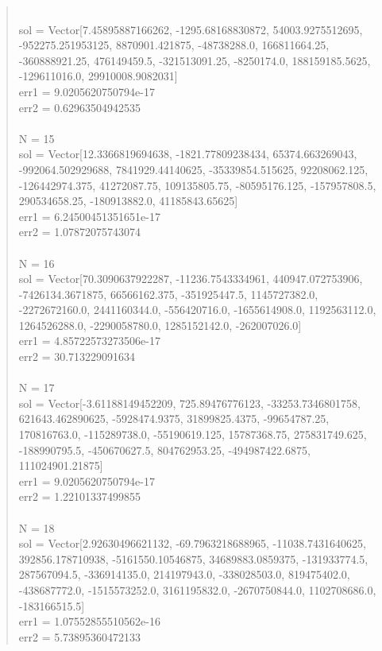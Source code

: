 \documentclass[letterpaper,12pt]{article}
\begin{document}
\begin{quote}
\\sol = Vector[7.45895887166262, -1295.68168830872, 54003.9275512695, -952275.251953125, 8870901.421875, -48738288.0, 166811664.25, -360888921.25, 476149459.5, -321513091.25, -8250174.0, 188159185.5625, -129611016.0, 29910008.9082031]
\\err1 = 9.0205620750794e-17
\\err2 = 0.62963504942535
\\
\\N = 15
\\sol = Vector[12.3366819694638, -1821.77809238434, 65374.663269043, -992064.502929688, 7841929.44140625, -35339854.515625, 92208062.125, -126442974.375, 41272087.75, 109135805.75, -80595176.125, -157957808.5, 290534658.25, -180913882.0, 41185843.65625]
\\err1 = 6.24500451351651e-17
\\err2 = 1.07872075743074
\\
\\N = 16
\\sol = Vector[70.3090637922287, -11236.7543334961, 440947.072753906, -7426134.3671875, 66566162.375, -351925447.5, 1145727382.0, -2272672160.0, 2441160344.0, -556420716.0, -1655614908.0, 1192563112.0, 1264526288.0, -2290058780.0, 1285152142.0, -262007026.0]
\\err1 = 4.85722573273506e-17
\\err2 = 30.713229091634
\\
\\N = 17
\\sol = Vector[-3.61188149452209, 725.89476776123, -33253.7346801758, 621643.462890625, -5928474.9375, 31899825.4375, -99654787.25, 170816763.0, -115289738.0, -55190619.125, 15787368.75, 275831749.625, -188990795.5, -450670627.5, 804762953.25, -494987422.6875, 111024901.21875]
\\err1 = 9.0205620750794e-17
\\err2 = 1.22101337499855
\\
\\N = 18
\\sol = Vector[2.92630496621132, -69.7963218688965, -11038.7431640625, 392856.178710938, -5161550.10546875, 34689883.0859375, -131933774.5, 287567094.5, -336914135.0, 214197943.0, -338028503.0, 819475402.0, -438687772.0, -1515573252.0, 3161195832.0, -2670750844.0, 1102708686.0, -183166515.5]
\\err1 = 1.07552855510562e-16
\\err2 = 5.73895360472133
\\

\end{quote}
\end{document}
